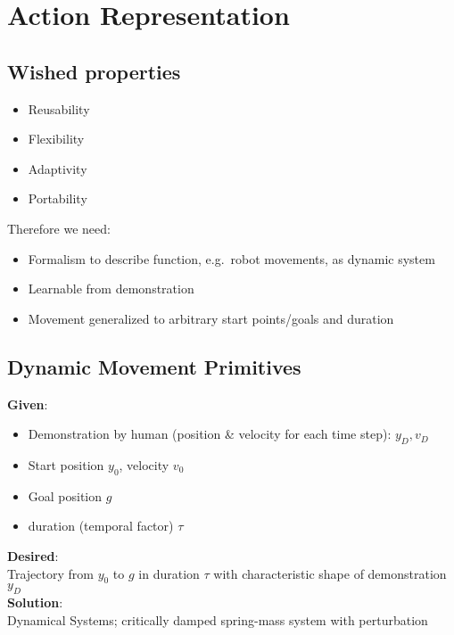 

\section{Action Representation}%
\label{ar:sec:action_representation}

\subsection{Wished properties}%
\label{ar:sub:wished_properties}
\begin{itemize}
\item Reusability
\item Flexibility
\item Adaptivity
\item Portability
\end{itemize}

Therefore we need:
\begin{itemize}
\item Formalism to describe function, e.g.\ robot movements, as dynamic system
\item Learnable from demonstration
\item Movement generalized to arbitrary start points/goals and duration
\end{itemize}

\subsection{Dynamic Movement Primitives}%
\label{ar:sub:dynamic_movement_primitives}
\textbf{Given}:
\begin{itemize}
\item Demonstration by human (position \& velocity for each time step): \(y_D, v_D\)
\item Start position \(y_0\), velocity \(v_0\)
\item Goal position \(g\)
\item duration (temporal factor) \(\tau\)
\end{itemize}
\textbf{Desired}:\\
Trajectory from \(y_0\) to \(g\) in duration \(\tau\) with characteristic shape of demonstration \(y_D\)\\
\textbf{Solution}:\\
Dynamical Systems; critically damped spring-mass system with perturbation

